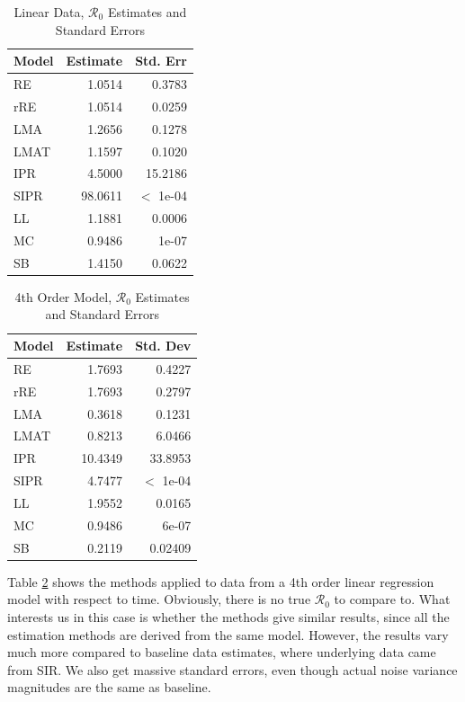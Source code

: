 \documentclass[12pt]{article}
\newcommand{\rr}{\ensuremath{\mathcal{R}_0}}
\begin{document}
\begin{table}[H]

	\centering
	\begin{tabular}[t]{l|r|r}
		\hline
		Model & Estimate & Std. Err\\
		\hline
		RE & 1.0514 & 0.3783\\
		\hline
		rRE & 1.0514 & 0.0259\\
		\hline
		LMA & 1.2656 & 0.1278\\
		\hline
		LMAT & 1.1597 & 0.1020\\
		\hline
		IPR & 4.5000 & 15.2186\\
		\hline
		SIPR & 98.0611 & $<$ 1e-04\\
		\hline
		LL & 1.1881 & 0.0006\\
		\hline
		MC & 0.9486 & 1e-07 \\
		\hline
		SB & 1.4150 & 0.0622\\
		\hline
	\end{tabular}
	\caption{Linear Data, $\rr$ Estimates and Standard Errors}\label{tab:other-res1}
\end{table}

\begin{table}[H]


\centering
\begin{tabular}[t]{l|r|r}
	\hline
	Model & Estimate & Std. Dev\\
	\hline
	RE & 1.7693 & 0.4227\\
	\hline
	rRE & 1.7693 & 0.2797\\
	\hline
	LMA & 0.3618 & 0.1231\\
	\hline
	LMAT & 0.8213 & 6.0466\\
	\hline
	IPR & 10.4349 & 33.8953 \\
	\hline
	SIPR & 4.7477 &  $<$ 1e-04\\
	\hline
	LL & 1.9552 & 0.0165\\
	\hline
	MC & 0.9486 & 6e-07\\
	\hline
	SB & 0.2119 & 0.02409\\
	\hline
\end{tabular}
\caption{4th Order Model, $\rr$ Estimates and Standard Errors}\label{tab:other-res2} 
\end{table}

Table \ref{tab:other-res2} shows the methods applied to data from a 4th order linear regression model with respect to time. Obviously, there is no true $\rr$ to compare to. What interests us in this case is whether the methods give similar results, since all the estimation methods are derived from the same model. However, the results vary much more compared to baseline data estimates, where underlying data came from SIR. We also get massive standard errors, even though actual noise variance magnitudes are the same as baseline.
\end{document}
